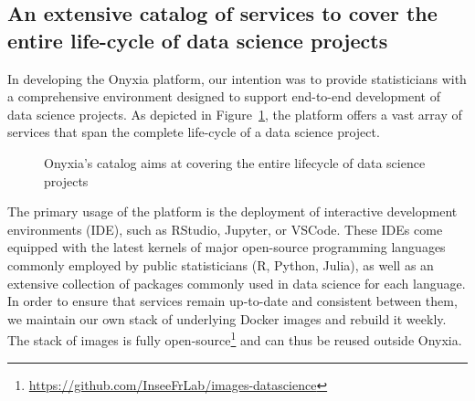 \documentclass[graybox]{svmult}
\begin{document}
\subsection{An extensive catalog of services to cover the entire life-cycle of data science projects}
\label{ssec:catalog}

In developing the Onyxia platform, our intention was to provide statisticians with a comprehensive environment designed to support end-to-end development of data science projects. As depicted in Figure~\ref{fig:onyxia-catalog}, the platform offers a vast array of services that span the complete life-cycle of a data science project.

\begin{figure}[htbp]
    \centering
    \caption{Onyxia's catalog aims at covering the entire lifecycle of data science projects}
    \label{fig:onyxia-catalog}
\end{figure}

The primary usage of the platform is the deployment of interactive development environments (IDE), such as RStudio, Jupyter, or VSCode. These IDEs come equipped with the latest kernels of major open-source programming languages commonly employed by public statisticians (R, Python, Julia), as well as an extensive collection of packages commonly used in data science for each language. In order to ensure that services remain up-to-date and consistent between them, we maintain our own stack of underlying Docker images and rebuild it weekly. The stack of images is fully open-source\footnote{\url{https://github.com/InseeFrLab/images-datascience}} and can thus be reused outside Onyxia.
\end{document}
